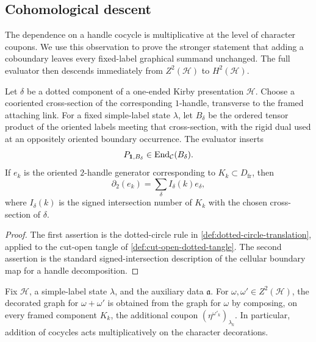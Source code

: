 \subsection{Cohomological descent}
\label{subsec:dotted-handle-interpretation}

The dependence on a handle cocycle is multiplicative at the level of
character coupons.  We use this observation to prove the stronger statement
that adding a coboundary leaves every fixed-label graphical summand unchanged.
The full evaluator then descends immediately from \(Z^2(\mathcal H)\) to
\(H^2(\mathcal H)\).

\begin{proposition}
\label{prop:dotted-handle-projector}
Let \(\delta\) be a dotted component of a one-ended Kirby presentation
\(\mathcal H\).  Choose a cooriented cross-section of the corresponding
\(1\)-handle, transverse to the framed attaching link.  For a fixed
simple-label state \(\lambda\), let \(B_\delta\) be the ordered tensor product
of the oriented labels meeting that cross-section, with the rigid dual used
at an oppositely oriented boundary occurrence.  The evaluator inserts
\[
  P_{\mathbf1,B_\delta}
  \in\operatorname{End}_{\mathcal{C}}(B_\delta).
\]
If \(e_k\) is the oriented \(2\)-handle generator corresponding to
\(K_k\subset D_{\mathrm{fr}}\), then
\begin{equation}
  \partial_2(e_k)=\sum_\delta I_\delta(k)e_\delta,
  \label{eq:dotted-cellular-boundary}
\end{equation}
where \(I_\delta(k)\) is the signed intersection number of \(K_k\) with the
chosen cross-section of \(\delta\).
\end{proposition}

\begin{proof}
The first assertion is the dotted-circle rule in
\cref{def:dotted-circle-translation}, applied to the cut-open tangle of
\cref{def:cut-open-dotted-tangle}.  The second assertion is the standard
signed-intersection description of the cellular boundary map for a handle
decomposition.
\end{proof}

\begin{lemma}
\label{lem:addition-of-character-decorations}
Fix \(\mathcal H\), a simple-label state \(\lambda\), and the auxiliary data
\(\mathfrak a\).  For \(\omega,\omega'\in Z^2(\mathcal H)\), the decorated
graph for \(\omega+\omega'\) is obtained from the graph for \(\omega\) by
composing, on every framed component \(K_k\), the additional coupon
\((\eta^{\omega'_k})_{\lambda_k}\).  In particular, addition of cocycles acts
multiplicatively on the character decorations.
\end{lemma}

